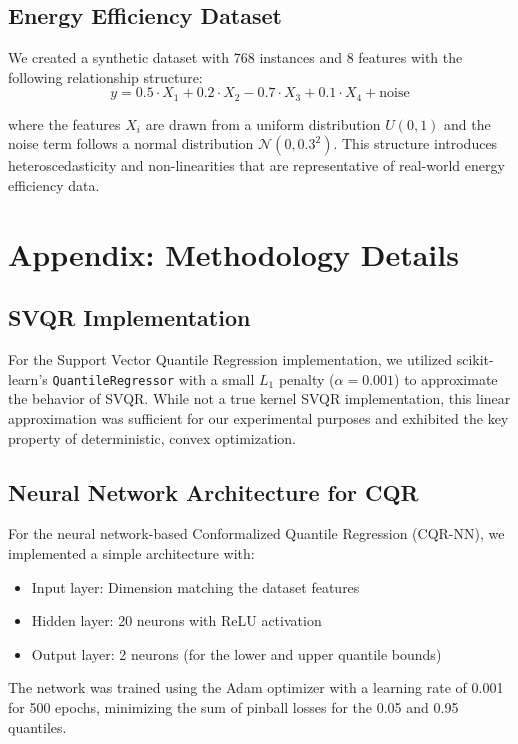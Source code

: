 \documentclass{article}
\begin{document}
\subsection{Energy Efficiency Dataset}
We created a synthetic dataset with 768 instances and 8 features with the following relationship structure:
\begin{equation}
y = 0.5 \cdot X_1 + 0.2 \cdot X_2 - 0.7 \cdot X_3 + 0.1 \cdot X_4 + \text{noise}
\end{equation}

where the features $X_i$ are drawn from a uniform distribution $U(0,1)$ and the noise term follows a normal distribution $\mathcal{N}(0, 0.3^2)$. This structure introduces heteroscedasticity and non-linearities that are representative of real-world energy efficiency data.

\section{Appendix: Methodology Details}
\label{app:methodology}

\subsection{SVQR Implementation}
For the Support Vector Quantile Regression implementation, we utilized scikit-learn's \texttt{QuantileRegressor} with a small $L_1$ penalty ($\alpha=0.001$) to approximate the behavior of SVQR. While not a true kernel SVQR implementation, this linear approximation was sufficient for our experimental purposes and exhibited the key property of deterministic, convex optimization.

\subsection{Neural Network Architecture for CQR}
For the neural network-based Conformalized Quantile Regression (CQR-NN), we implemented a simple architecture with:
\begin{itemize}
    \item Input layer: Dimension matching the dataset features
    \item Hidden layer: 20 neurons with ReLU activation
    \item Output layer: 2 neurons (for the lower and upper quantile bounds)
\end{itemize}

The network was trained using the Adam optimizer with a learning rate of 0.001 for 500 epochs, minimizing the sum of pinball losses for the 0.05 and 0.95 quantiles.
\end{document}
